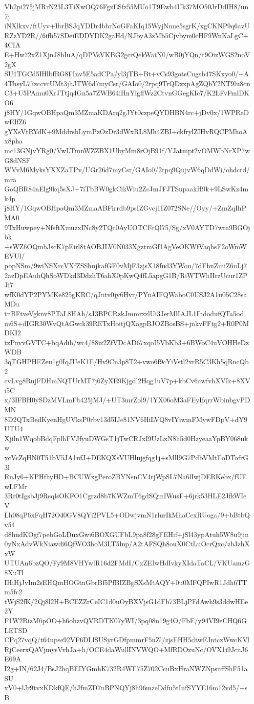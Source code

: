 Vb2pi275jMRrN23L3TiXwOQ76FgzESfz55MUo1T9Ewb4Uk37MO50JrDdIH8/un7j
iNXlkxv/ftUyv+IbrBSJqYDDr4bbrNoGFaKIq15WyjNune5sgrK/xgCKNP9q6avU
RZzYD2R//6ifh57SDeiEDDYDK2gaHd/NJbyA3zMb5Cjvbym0cHF9WnKaLgC+4CIA
E+Hw72xZ1XjnJ8bIuA/qDPVsVKBG2gcrQekWatN0/wB0jYQn/t9OizWGS2noV2gX
SU1TGCd5IHlbfRG8FInv5E5adCPa/yl3jTB+Bt+vCs93gotsCugsb47SKxyo0/+A
4ThsyL77zccvcUMt3jhJTW6d7myCsr/GAIo0/2rpq9TrQDzxpAgZQbY2NT9lu8cn
C3+U5PAmu0XrJTtjq4Gn5a7ZWB64iHnYigflWz2CtvnGGegKIc7/K2LFvFmlDKO6
j8HY/1GqwOBHpaQm3MZmaKDArq2gJYt0czpeQYDHBN4rc+jDv0x/1WPReDwEIfZ6
gYXsVtRYdK+9MddrshLymPzOzDr3dWxRL8Mh4ZBI+ckfrylZIHvRQCPMhoAx8pha
mc13GNjvYRg0/VwLTmnWZZBX1UbyMm8rOjB91f/YJatmpt2vOMWbNrXP7wG8dNSF
WVvM6MyksYXXZaTPv/UGr26d7myCsr/GAIo0/2rpq9QujvW6qDdWi/ohdcrd/mra
GoQBR84nElg9kq5sXJ+7iTbBW0gkCikWiu2ZcJmJFJTSupaakH9k+9LSwKz4mk4p
j8HY/1GqwOBHpaQm3MZmaABFirrdb9psIZGvcj1IZ072SNe//Oyy/+ZmZqIhPMA0
9TxHuwpey+NfsftXmuzxINc8y2TQc0AyUOTCFcQl75/Sg/xV0AYTD7wra9BGOjbk
+sWZ6OQmbJscK7pEirl8tAOBJLV0N033XgztmGf1AgVeOKWfVaqhsF2oWmWEVUl/
popNSm/9wiNSXrcVXfZSShujkafGF0vMjF3zjsX18fud3YWou/7dFbnZmiZ6uLj7
2azDpEAuhQhSoWDkd3DdzliT6ahX0pKwQ4fL5apgG1B/RiWTWhIIrzUcur1ZPJi7
wfK0dYP2PYMKe825gKRC/qJntv0jy6Hvr/PYuAIFQWaboC0USJ2A1u05C28saMDu
tnBFtveVgknv8PTaL8HAh/sJ3BPCRzkJmmrzzlUi3JerMlIAJL1IhdodufQTa5od
m6S+dIGR30WvQtAGwck39RETxHoitjQXagpBJOZBosBS+jnkvFFtg2+R0P0MDKI2
tzPnvvGVTC+bqAdih/wc4/88iz2ZfVDcAD67xqoI5VbKb3+6BWoC4uVOHHeDzWDB
3qTGHPHEZeu1g0IqJUeK1E/Hv9Cn3p8T2+vwo6f9cYiVstl2xrR5C3Kh5qRncQb2
cvLvg8RujFDHmNQTUrMT7j6ZyXE9Kjgdl2Hqg1uV7p+kbCv6awfvhXVIz+8XVi5C
x/3IFBH0ySDzMVLmFb425jMJ/+UT3mrZol9/1YX06oM3aFEyIfqrrWbinbgvPDMN
8D2QTxBedKyenHgUVksP0rbv13d5IJe81NV6HiLVQ8vIYiwmFMywFDpV+dY9UTU4
Xjiln1WqobBdqFplhFVJfyuDWGsT1jTwCRJxI9UzLxN8h5d0HzyeaaYpBY068ukw
xcVcZqHN0T51bV5JA1ufJ+DEKQXsVUHlujgfqg1j+sMll9G7PdbVMtEoDTofrG3l
RuJy6+KPHfhyHD+BCUWxgPeroZBYNsnCV4rjWpSL7Na6lIwjDERKebx/fUFwLFMr
3Rr0tIgsbJj9RsqlsOKFO1Cgrzd8b7KWZmT6gdSQmIWusF+6jrk53HLE2JfkWIeV
Lh08qP6xFqH72O40GV8QYi2PVL5+ODwjvmN1rlurIkMhaCcxRUoga/9+bBtbQv54
d8hudKOgf7pebGoLDuxGwi6BOXGUFbL9pa8f28gFEHif+jSl43ypAtuh5W8u9jin
0yNxAdvWkNiawdi6QfWO3hoM3LT5lnp/A2tAFSQh8ouX0CtLuOcrQxc/zb3zhXxW
UTUAn6bzQO/Fy9M8VHYwlR16d2FMdI/CxZEIwHdIvkyXIdaTaCL/VKUamzG8XuTl
IHiHjJvIm2sEHQmHOGtnGbrBf5PfBIZBgSXsMtAQY+0u0MFQPIwR1Jdh6TTm5fc2
tWjS2fK/2Qj8l2H+BCEZZrCeIC1d0uOyBXVjsG1dFb73BLjPFdAwh9s3ddwHEe2Y
F1W2RizM6pOO+h6ohzvQVRDTK07yWI/3pq08n19g4O/FbE/y94VI9eCHQ6GLETSD
CPq27vqQ/t64upse92VF6DLlSUSyrGDfpmmrF5uZl/zjsEHH5dtwFJntczWwcKVl
RjCeerxQAVjmysVvhJa+h/OCE4daWullINVWQO+MfRDOzuNc/OVX1i9JcnJ6E69A
I2g+IN/62J4/BsJ2hqBEIYGmhK732R4WF75Z702CcuBxHraNWZNpsuffShF51aSU
xV0+lJr9tvxKDkfQE/hJfmZD7nBPNQYj8h96mzeDdfu5tIufSYYE16m12vd5/+sB
